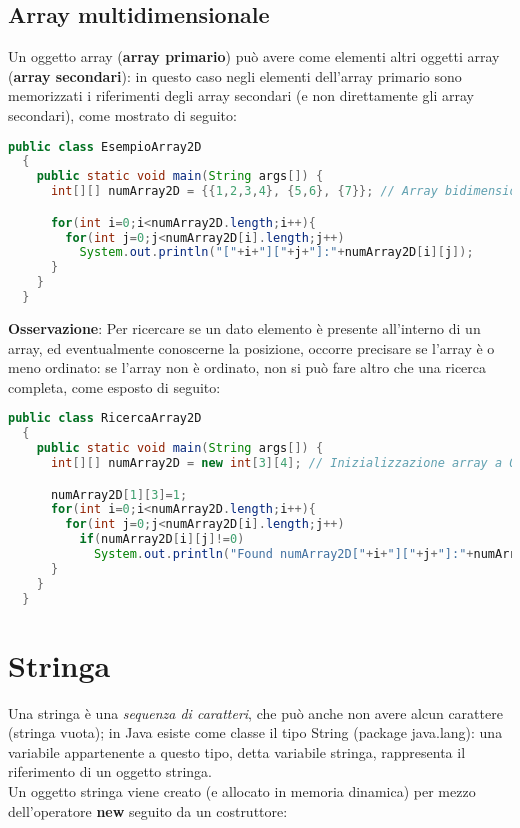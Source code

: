 \documentclass[a4paper]{extarticle}
\begin{document}
\vspace{1em}
\subsection{Array multidimensionale}
Un oggetto array (\textbf{array primario}) può avere come elementi altri oggetti array (\textbf{array secondari}): in questo caso negli elementi dell’array primario sono memorizzati i riferimenti degli array secondari (e non direttamente gli array secondari), come mostrato di seguito:

\vspace{1em}
\noindent
\begin{lstlisting}[language=Java, caption=Array multidimensionale in Java]
  public class EsempioArray2D
  {
    public static void main(String args[]) {
      int[][] numArray2D = {{1,2,3,4}, {5,6}, {7}}; // Array bidimensionale

      for(int i=0;i<numArray2D.length;i++){
        for(int j=0;j<numArray2D[i].length;j++)
          System.out.println("["+i+"]["+j+"]:"+numArray2D[i][j]);
      }
    }
  }
\end{lstlisting}

\vspace{1em}
\noindent
\textbf{Osservazione}: Per ricercare se un dato elemento è presente all’interno di un array, ed eventualmente conoscerne la posizione, occorre precisare se l’array è o meno ordinato: se l’array non è ordinato, non si può fare altro che una ricerca completa, come esposto di seguito:

\newpage
\noindent
\begin{lstlisting}[language=Java, caption=Array multidimensionale in Java]
  public class RicercaArray2D
  {
    public static void main(String args[]) {
      int[][] numArray2D = new int[3][4]; // Inizializzazione array a 0

      numArray2D[1][3]=1;
      for(int i=0;i<numArray2D.length;i++){
        for(int j=0;j<numArray2D[i].length;j++)
          if(numArray2D[i][j]!=0)
            System.out.println("Found numArray2D["+i+"]["+j+"]:"+numArray2D[i][j]);
      }
    }
  }
\end{lstlisting}

\newpage
\section{Stringa}
Una stringa è una \emph{sequenza di caratteri}, che può anche non avere alcun carattere (stringa vuota); in Java esiste come classe il tipo String (package java.lang): una variabile appartenente a questo tipo, detta variabile stringa, rappresenta il riferimento di un oggetto stringa.\\
Un oggetto stringa viene creato (e allocato in memoria dinamica) per mezzo dell’operatore \textbf{new} seguito da un costruttore:
\end{document}
